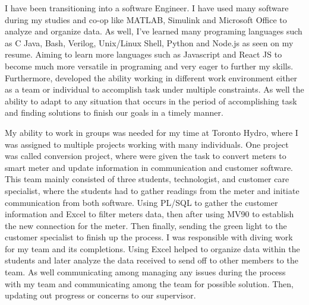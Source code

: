 \documentclass[11pt, a4paper]{awesome-cv} %
\begin{document}
\makecvheader %


\makelettertitle %


\begin{cvletter}


\tab I have been transitioning into a software Engineer. I have used many software during my studies and co-op like MATLAB, Simulink and Microsoft Office to analyze and organize data. As well, I've learned many programing languages such as C Java, Bash, Verilog, Unix/Linux Shell, Python and Node.js as seen on my resume. Aiming to learn more languages such as Javascript and React JS to become much more versatile in programing and very eager to further my skills. Furthermore, developed the ability working in different work environment either as a team or individual to accomplish task under multiple constraints. As well the ability to adapt to any situation that occurs in the period of accomplishing task and finding solutions to finish our goals in a timely manner.  

\tab My ability to work in groups was needed for my time at Toronto Hydro, where I was assigned to multiple projects working with many individuals. One project was called conversion project, where were given the task to convert meters to smart meter and update information in communication and customer software. This team mainly consisted of three students, technologist, and customer care specialist, where the students had to gather readings from the meter and initiate communication from both software. Using PL/SQL to gather the customer information and Excel to filter meters data, then after using MV90 to establish the new connection for the meter. Then finally, sending the green light to the customer specialist to finish up the process. I was responsible with diving work for my team and its completions. Using Excel helped to organize data within the students and later analyze the data received to send off to other members to the team. As well communicating among managing any issues during the process with my team and communicating among the team for possible solution. Then, updating out progress or concerns to our supervisor.


\end{cvletter}
\end{document}
